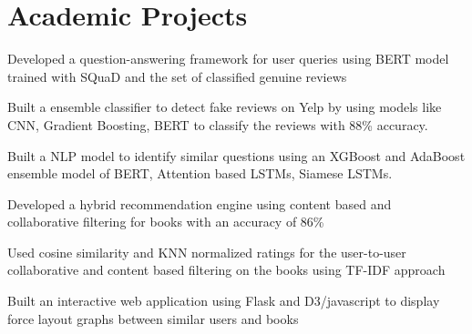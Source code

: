 \documentclass[]{resume-openfont}
\begin{document}
\begin{minipage}[t]{0.66\textwidth}

\section{Academic Projects}

\descript{}
\begin{tightemize}
\item Developed a question-answering framework for user queries using BERT model trained with SQuaD and the set of classified genuine reviews 
\item Built a ensemble classifier to detect fake reviews on Yelp by using models like CNN, Gradient Boosting, BERT to classify the reviews with 88\% accuracy.
\end{tightemize}
\sectionsep

\descript{}
\begin{tightemize}
\item Built a NLP model to identify similar questions using an XGBoost and AdaBoost ensemble model of BERT, Attention based LSTMs, Siamese LSTMs.
\end{tightemize}
\sectionsep

\descript{}
\begin{tightemize}
\item Developed a hybrid recommendation engine using content based and collaborative filtering for books with an accuracy of 86\%
\item Used cosine similarity and KNN normalized ratings for the  user-to-user collaborative and content based filtering on the books using TF-IDF approach
\item Built an interactive web application using Flask and  D3/javascript to display force layout graphs between similar users and books
\end{tightemize}
\sectionsep


\end{minipage}
\end{document}
